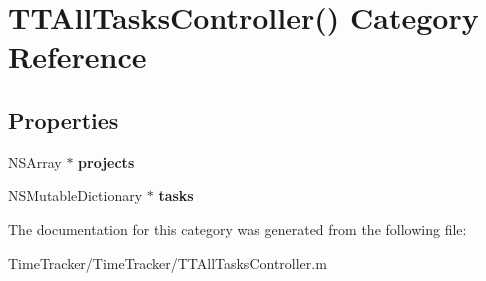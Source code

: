 \hypertarget{category_t_t_all_tasks_controller_07_08}{\section{T\-T\-All\-Tasks\-Controller() Category Reference}
\label{category_t_t_all_tasks_controller_07_08}
}
\subsection*{Properties}
\begin{DoxyCompactItemize}
\item 
\hypertarget{category_t_t_all_tasks_controller_07_08_ab3e24fc6486d9600ec9dc965d10cf5d6}{N\-S\-Array $\ast$ {\bfseries projects}}\label{category_t_t_all_tasks_controller_07_08_ab3e24fc6486d9600ec9dc965d10cf5d6}

\item 
\hypertarget{category_t_t_all_tasks_controller_07_08_aa1c5d3b22cbd8e054f16abb69a6c38cf}{N\-S\-Mutable\-Dictionary $\ast$ {\bfseries tasks}}\label{category_t_t_all_tasks_controller_07_08_aa1c5d3b22cbd8e054f16abb69a6c38cf}

\end{DoxyCompactItemize}


The documentation for this category was generated from the following file\-:\begin{DoxyCompactItemize}
\item 
Time\-Tracker/\-Time\-Tracker/T\-T\-All\-Tasks\-Controller.\-m\end{DoxyCompactItemize}
